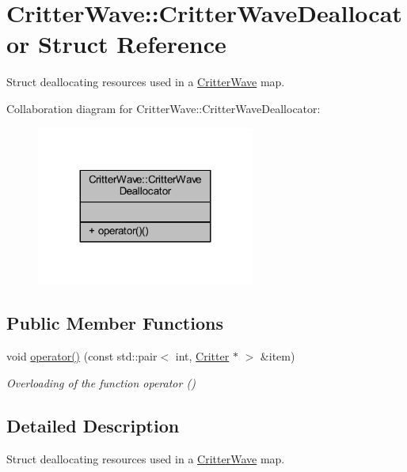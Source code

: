 \hypertarget{struct_critter_wave_1_1_critter_wave_deallocator}{\section{Critter\+Wave\+:\+:Critter\+Wave\+Deallocator Struct Reference}
\label{struct_critter_wave_1_1_critter_wave_deallocator}
}


Struct deallocating resources used in a \hyperlink{class_critter_wave}{Critter\+Wave} map.  




Collaboration diagram for Critter\+Wave\+:\+:Critter\+Wave\+Deallocator\+:
\nopagebreak
\begin{figure}[H]
\begin{center}
\leavevmode
\includegraphics[width=203pt]{struct_critter_wave_1_1_critter_wave_deallocator__coll__graph}
\end{center}
\end{figure}
\subsection*{Public Member Functions}
\begin{DoxyCompactItemize}
\item 
void \hyperlink{struct_critter_wave_1_1_critter_wave_deallocator_a3b5befe161e66cd3d7cf9d72b948cd6a}{operator()} (const std\+::pair$<$ int, \hyperlink{class_critter}{Critter} $\ast$ $>$ \&item)
\begin{DoxyCompactList}\small\item\em Overloading of the function operator () \end{DoxyCompactList}\end{DoxyCompactItemize}


\subsection{Detailed Description}
Struct deallocating resources used in a \hyperlink{class_critter_wave}{Critter\+Wave} map. 

